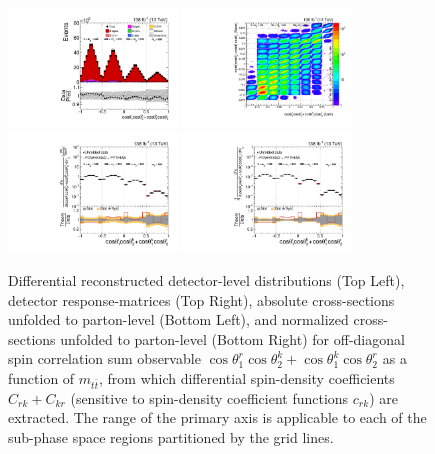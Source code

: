 \clearpage
\begin{figure}[htb]
\begin{center}
 \includegraphics[width=0.40\textwidth]{fig_fullRun2UL/controlplots/combined/Hyp_LLBarCPrk_vs_TTBarMass.pdf}
 \includegraphics[width=0.40\textwidth]{fig_fullRun2UL/unfolding/combined/ResponseMatrix_c_Prk_mttbar.pdf} \\
 \includegraphics[width=0.40\textwidth]{fig_fullRun2UL/unfolding/combined/UnfoldedResults_c_Prk_mttbar.pdf}
 \includegraphics[width=0.40\textwidth]{fig_fullRun2UL/unfolding/combined/UnfoldedResultsNorm_c_Prk_mttbar.pdf} \\
\label{fig:c_Prk_mttbar}
\caption{Differential reconstructed detector-level distributions (Top Left), detector response-matrices (Top Right), absolute cross-sections unfolded to parton-level (Bottom Left), and normalized cross-sections unfolded to parton-level (Bottom Right) for off-diagonal spin correlation sum observable $\cos\theta_{1}^{r}\cos\theta_{2}^{k}+\cos\theta_{1}^{k}\cos\theta_{2}^{r}$ as a function of $m_{t\bar{t}}$, from which differential spin-density coefficients $C_{rk}+C_{kr}$ (sensitive to spin-density coefficient functions $c_{r k}$) are extracted.  The range of the primary axis is applicable to each of the sub-phase space regions partitioned by the grid lines.}
\end{center}
\end{figure}
